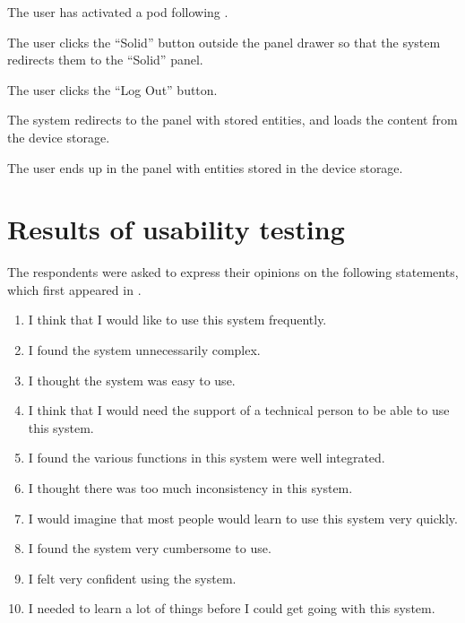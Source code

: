 
\begin{ucitemize}
\item The user has activated a pod following \emph{}.
\end{ucitemize}


\begin{ucenumerate}
\item The user clicks the ``Solid'' button outside the panel drawer so that the system redirects them to the ``Solid'' panel.
\item The user clicks the ``Log Out'' button.
\item The system redirects to the panel with stored entities, and loads the content from the device storage.
\end{ucenumerate}


\begin{ucitemize}
\item The user ends up in the panel with entities stored in the device storage.
\end{ucitemize}

\section{Results of usability testing}\label{sec:results-usability-testing}


The respondents were asked to express their opinions on the following statements, which first appeared in \cite{brooke96}.

\begin{enumerate}[label=\textbf{S\arabic*}]
\item\label{itm:sus-01} I think that I would like to use this system frequently.
\item\label{itm:sus-02} I found the system unnecessarily complex.
\item\label{itm:sus-03} I thought the system was easy to use.
\item\label{itm:sus-04} I think that I would need the support of a technical person to be able to use this system.
\item\label{itm:sus-05} I found the various functions in this system were well integrated.
\item\label{itm:sus-06} I thought there was too much inconsistency in this system.
\item\label{itm:sus-07} I would imagine that most people would learn to use this system very quickly.
\item\label{itm:sus-08} I found the system very cumbersome to use.
\item\label{itm:sus-09} I felt very confident using the system.
\item\label{itm:sus-10} I needed to learn a lot of things before I could get going with this system.
\end{enumerate}


